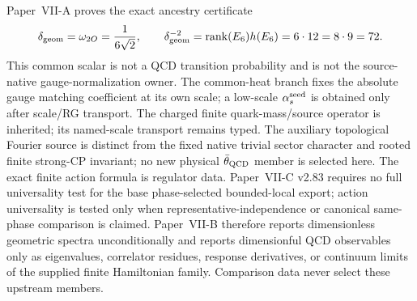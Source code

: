 \documentclass[12pt,a4paper]{article}
\providecommand{\deltageom}{\delta_{\rm geom}}
\providecommand{\alphasseed}{\alpha_s^{\rm seed}}
\begin{document}
\begin{remark}\label{p11:rem:conditional-strong-interface-scope}
Paper~VII-A proves the exact ancestry certificate
\[
 \deltageom=\omega_{2O}=\frac1{6\sqrt2},
 \qquad
 \deltageom^{-2}=\operatorname{rank}(E_6)h(E_6)=6\cdot12=8\cdot9=72.
\]
This common scalar is not a QCD transition probability and is not the
source-native gauge-normalization owner.  The common-heat branch fixes the
absolute gauge matching coefficient at its own scale; a low-scale
\(\alphasseed\) is obtained only after scale/RG transport.  The charged finite quark-mass/source operator is inherited; its named-scale transport remains typed.  The auxiliary topological Fourier source is distinct from the fixed native trivial sector character and rooted finite strong-CP invariant; no new physical \(\bar\theta_{\rm QCD}\) member is selected here.  The exact finite action formula is regulator data.  Paper~VII-C v2.83 requires no full universality test for the base phase-selected bounded-local export; action universality is tested only when representative-independence or canonical same-phase comparison is claimed.  Paper~VII-B therefore reports dimensionless geometric spectra
unconditionally and reports dimensionful QCD observables only as eigenvalues,
correlator residues, response derivatives, or continuum limits of the supplied
finite Hamiltonian family.  Comparison data never select these upstream
members.
\end{remark}

\begin{center}
\end{center}
\end{document}
